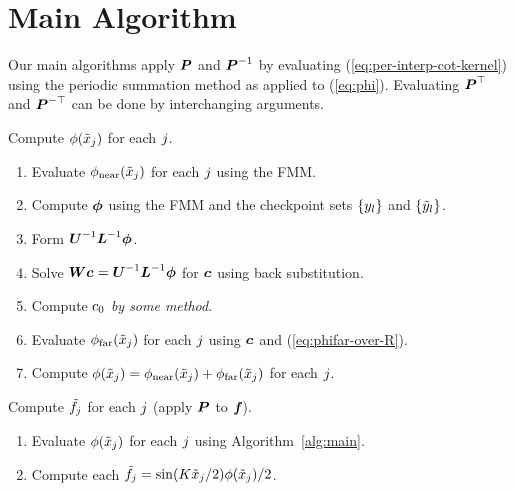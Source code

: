 \section{Main Algorithm}

Our main algorithms apply $\boldsymbol{P}$ and $\boldsymbol{P}^{-1}$ by evaluating
(\ref{eq:per-interp-cot-kernel}) using the periodic summation method
as applied to (\ref{eq:phi}). Evaluating $\boldsymbol{P}^\top$ and
$\boldsymbol{P}^{-\top}$ can be done by interchanging arguments.

\begin{centering}
  \begin{algorithm}\label{alg:main}
    Compute $\phi({\tilde{x}}_{j})$ for each $j$.
    \begin{enumerate}
    \item Evaluate $\phi_{\operatorname{near}}({\tilde{x}}_{j})$ for each
      $j$ using the FMM.\@
    \item Compute $\boldsymbol{\phi}$ using the FMM and the checkpoint sets
      $\left\{y_l\right\}$ and $\left\{{\tilde{y}}_l\right\}$.
    \item Form $\boldsymbol{U}^{-1}\boldsymbol{L}^{-1}\boldsymbol{\phi}$.
    \item Solve
      $\boldsymbol{W}\boldsymbol{{c}_{}} =
      \boldsymbol{U}^{-1}\boldsymbol{L}^{-1}\boldsymbol{\phi}$ for $\boldsymbol{{c}_{}}$ using
      back substitution.
    \item Compute ${c}_{0}$ \TODO{} \emph{by some method}.
    \item Evaluate $\phi_{\operatorname{far}}({\tilde{x}}_{j})$ for each
      $j$ using $\boldsymbol{{c}_{}}$ and
      (\ref{eq:phifar-over-R}).
    \item Compute
      $\phi({\tilde{x}}_{j}) = \phi_{\operatorname{near}}({\tilde{x}}_{j}) +
      \phi_{\operatorname{far}}({\tilde{x}}_{j})$ for each $j$.
    \end{enumerate}
  \end{algorithm}
\end{centering}

\begin{centering}
  \begin{algorithm}\label{alg:apply-P}
    Compute ${\tilde{f}}_{j}$ for each $j$ (apply
      $\boldsymbol{P}$ to $\boldsymbol{{f}_{}}$).
    \begin{enumerate}
    \item Evaluate $\phi({\tilde{x}}_{j})$ for each $j$
      using Algorithm~\ref{alg:main}.
    \item Compute each
      ${\tilde{f}}_{j} =
      \sin(K{}{\tilde{x}}_{j}/2)\phi({\tilde{x}}_{j})/2$.
    \end{enumerate}
  \end{algorithm}
\end{centering}

